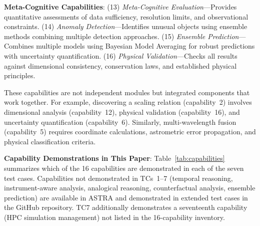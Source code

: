 \documentclass[usenatbib]{rasti}
\begin{document}
\textbf{Meta-Cognitive Capabilities}: (13) \textit{Meta-Cognitive Evaluation}---Provides quantitative assessments of data sufficiency, resolution limits, and observational constraints. (14) \textit{Anomaly Detection}---Identifies unusual objects using ensemble methods combining multiple detection approaches. (15) \textit{Ensemble Prediction}---Combines multiple models using Bayesian Model Averaging for robust predictions with uncertainty quantification. (16) \textit{Physical Validation}---Checks all results against dimensional consistency, conservation laws, and established physical principles.

These capabilities are not independent modules but integrated components that work together. For example, discovering a scaling relation (capability~2) involves dimensional analysis (capability~12), physical validation (capability~16), and uncertainty quantification (capability~6). Similarly, multi-wavelength fusion (capability~5) requires coordinate calculations, astrometric error propagation, and physical classification criteria.

\textbf{Capability Demonstrations in This Paper}: Table~\ref{tab:capabilities} summarizes which of the 16 capabilities are demonstrated in each of the seven test cases. Capabilities not demonstrated in TCs~1--7 (temporal reasoning, instrument-aware analysis, analogical reasoning, counterfactual analysis, ensemble prediction) are available in ASTRA and demonstrated in extended test cases in the GitHub repository. TC7 additionally demonstrates a seventeenth capability (HPC simulation management) not listed in the 16-capability inventory.
\end{document}
